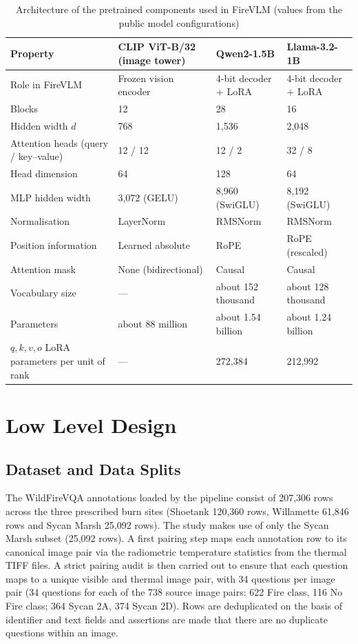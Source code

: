 \documentclass[12pt]{report}
\begin{document}
\begin{table}[htbp]
  \centering
  \caption{Architecture of the pretrained components used in FireVLM (values from the public model configurations)}
  \label{tab:components}
  \footnotesize
  \setlength{\tabcolsep}{3pt}
  \begin{tabular}{P{1.15in}P{1.3in}P{1.4in}P{1.4in}}
    \toprule
    \textbf{Property} & \textbf{CLIP ViT-B/32 (image tower)} & \textbf{Qwen2-1.5B} & \textbf{Llama-3.2-1B} \\
    \midrule
    Role in FireVLM & Frozen vision encoder & 4-bit decoder + LoRA & 4-bit decoder + LoRA \\
    Blocks & 12 & 28 & 16 \\
    Hidden width $d$ & 768 & 1,536 & 2,048 \\
    Attention heads (query / key--value) & 12 / 12 & 12 / 2 & 32 / 8 \\
    Head dimension & 64 & 128 & 64 \\
    MLP hidden width & 3,072 (GELU) & 8,960 (SwiGLU) & 8,192 (SwiGLU) \\
    Normalisation & LayerNorm & RMSNorm & RMSNorm \\
    Position information & Learned absolute & RoPE & RoPE (rescaled) \\
    Attention mask & None (bidirectional) & Causal & Causal \\
    Vocabulary size & --- & about 152 thousand & about 128 thousand \\
    Parameters & about 88 million & about 1.54 billion & about 1.24 billion \\
    $q,k,v,o$ LoRA parameters per unit of rank & --- & 272,384 & 212,992 \\
    \bottomrule
  \end{tabular}
\end{table}

\section{Low Level Design}
\subsection{Dataset and Data Splits}
\label{sec:dataset}
The WildFireVQA annotations loaded by the pipeline consist of 207,306 rows across the three prescribed burn sites (Shoetank 120,360 rows, Willamette 61,846 rows and Sycan Marsh 25,092 rows). The study makes use of only the Sycan Marsh subset (25,092 rows). A first pairing step maps each annotation row to its canonical image pair via the radiometric temperature statistics from the thermal TIFF files. A strict pairing audit is then carried out to ensure that each question maps to a unique visible and thermal image pair, with 34 questions per image pair (34 questions for each of the 738 source image pairs: 622 Fire class, 116 No Fire class; 364 Sycan 2A, 374 Sycan 2D). Rows are deduplicated on the basis of identifier and text fields and assertions are made that there are no duplicate questions within an image.
\end{document}
